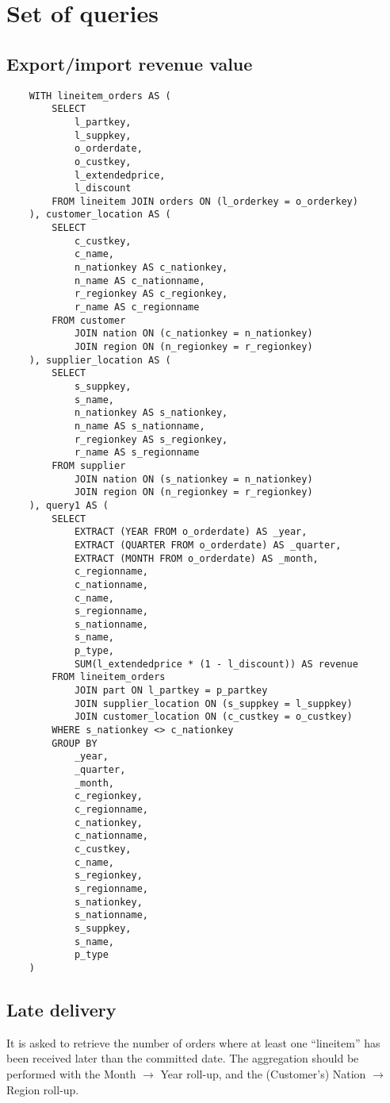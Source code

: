 

\section{Set of queries}

\subsection{Export/import revenue value}

\begin{lstlisting}
	WITH lineitem_orders AS (
		SELECT 
			l_partkey, 
			l_suppkey, 
			o_orderdate, 
			o_custkey, 
			l_extendedprice, 
			l_discount
		FROM lineitem JOIN orders ON (l_orderkey = o_orderkey)
	), customer_location AS (
		SELECT 
			c_custkey, 
			c_name, 
			n_nationkey AS c_nationkey, 
			n_name AS c_nationname, 
			r_regionkey AS c_regionkey, 
			r_name AS c_regionname 
		FROM customer 
			JOIN nation ON (c_nationkey = n_nationkey)
			JOIN region ON (n_regionkey = r_regionkey)
	), supplier_location AS (
		SELECT 
			s_suppkey, 
			s_name, 
			n_nationkey AS s_nationkey, 
			n_name AS s_nationname, 
			r_regionkey AS s_regionkey, 
			r_name AS s_regionname 
		FROM supplier 
			JOIN nation ON (s_nationkey = n_nationkey)
			JOIN region ON (n_regionkey = r_regionkey)
	), query1 AS (
		SELECT
			EXTRACT (YEAR FROM o_orderdate) AS _year,
			EXTRACT (QUARTER FROM o_orderdate) AS _quarter,
			EXTRACT (MONTH FROM o_orderdate) AS _month,
			c_regionname,
			c_nationname,
			c_name,
			s_regionname,
			s_nationname,
			s_name,
			p_type,
			SUM(l_extendedprice * (1 - l_discount)) AS revenue
		FROM lineitem_orders 
			JOIN part ON l_partkey = p_partkey
			JOIN supplier_location ON (s_suppkey = l_suppkey)
			JOIN customer_location ON (c_custkey = o_custkey)
		WHERE s_nationkey <> c_nationkey
		GROUP BY
			_year,
			_quarter,
			_month,
			c_regionkey,
			c_regionname,
			c_nationkey,
			c_nationname,
			c_custkey,
			c_name,
			s_regionkey,
			s_regionname,
			s_nationkey,
			s_nationname,
			s_suppkey,
			s_name,
			p_type
	) 
\end{lstlisting}


\subsection{Late delivery}

It is asked to retrieve the number of orders where at least one ``lineitem'' has been received later than the committed date.
The aggregation should be performed with the Month $\rightarrow$ Year roll-up, and the (Customer's) Nation $\rightarrow$ Region roll-up.

